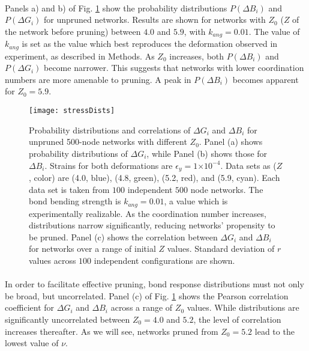 \documentclass[9pt,twocolumn,twoside]{pnas-new}
\providecommand{\e}[1]{\ensuremath{\times 10^{#1}}}
\begin{document}
\paragraph{}
Panels a) and b) of Fig. \ref{fig:stressDists} show the probability distributions $P(\Delta B_{i})$ and $P(\Delta G_{i})$ for unpruned networks. Results are shown for networks with $Z_{0}$ ($Z$ of the network before pruning) between $4.0$ and $5.9$, with $k_{ang} = 0.01$.  The value of $k_{ang}$ is set as the value which best reproduces the deformation observed in experiment, as described in Methods.  As $Z_{0}$ increases, both $P(\Delta B_{i})$ and $P(\Delta G_{i})$ become narrower.  This  suggests that networks with lower coordination numbers are more amenable to pruning.  A peak in $P(\Delta B_{i})$ becomes apparent for $Z_{0}=5.9$.  

\begin{figure}
	\centering
	\texttt{[image: stressDists]}
\caption{Probability distributions and correlations of $\Delta G_{i}$ and $\Delta B_{i}$ for unpruned 500-node networks with different $Z_{0}$. Panel (a) shows probability distributions of $\Delta G_{i}$, while Panel (b) shows those for $\Delta B_{i}$.   Strains for both deformations are $\epsilon_{y}=1\e{-4}$.   Data sets as ($Z$, color) are (4.0, blue), (4.8, green), (5.2, red), and (5.9, cyan).  Each data set is taken from $100$ independent $500$ node networks.  The bond bending strength is $k_{ang} = 0.01$, a value which is experimentally realizable.  As the coordination number increases, distributions narrow significantly, reducing networks' propensity to be pruned.  Panel (c) shows the correlation between $\Delta G_{i}$ and $\Delta B_{i}$ for networks over a range of initial $Z$ values.  Standard deviation of $r$ values across $100$ independent configurations are shown.}
	\label{fig:stressDists}
\end{figure}

\paragraph{}

In order to facilitate effective pruning, bond response distributions must not only be broad, but uncorrelated.  Panel (c) of Fig. \ref{fig:stressDists} shows the Pearson correlation coefficient for $\Delta G_{i}$ and $\Delta B_{i}$ across a range of $Z_{0}$ values.  While distributions are significantly uncorrelated between $Z_{0}=4.0$ and $5.2$, the level of correlation increases thereafter.  As we will see, networks pruned from $Z_{0}=5.2$ lead to the lowest value of $\nu$.
\end{document}
